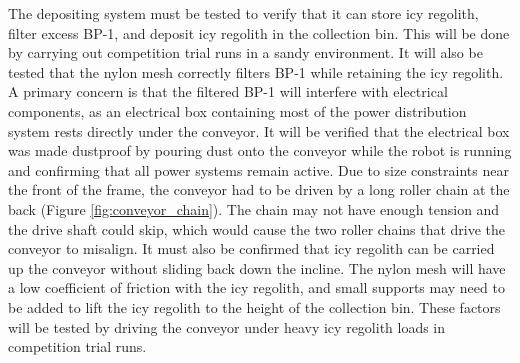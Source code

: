 \documentclass[class=article, crop=false]{standalone}
\begin{document}
	The depositing system must be tested to verify that it can store icy regolith, filter excess BP-1, and deposit icy regolith in the collection bin. This will be done by carrying out competition trial runs in a sandy environment. It will also be tested that the nylon mesh correctly filters BP-1 while retaining the icy regolith. A primary concern is that the filtered BP-1 will interfere with electrical components, as an electrical box containing most of the power distribution system rests directly under the conveyor. It will be verified that the electrical box was made dustproof by pouring dust onto the conveyor while the robot is running and confirming that all power systems remain active.
	Due to size constraints near the front of the frame, the conveyor had to be driven by a long roller chain at the back (Figure \ref{fig:conveyor_chain}). The chain may not have enough tension and the drive shaft could skip, which would cause the two roller chains that drive the conveyor to misalign. It must also be confirmed that icy regolith can be carried up the conveyor without sliding back down the incline. The nylon mesh will have a low coefficient of friction with the icy regolith, and small supports may need to be added to lift the icy regolith to the height of the collection bin. These factors will be tested by driving the conveyor under heavy icy regolith loads in competition trial runs.
		
			
	
	
\end{document}
